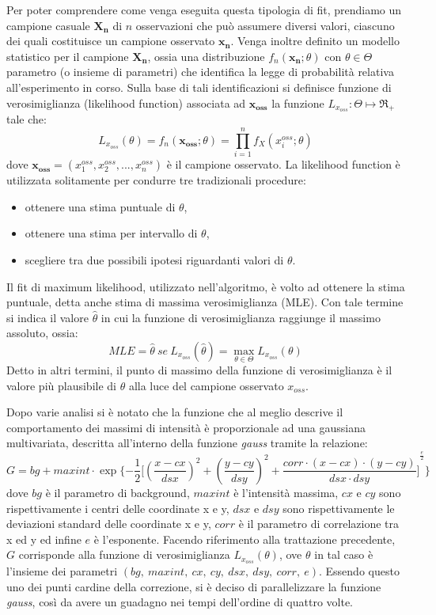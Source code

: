 Per poter comprendere come venga eseguita questa tipologia di fit, prendiamo un campione casuale $\mathbf{X_n}$ di $n$ osservazioni che può assumere diversi valori, ciascuno dei quali costituisce un campione osservato $\mathbf{x_n}$.
Venga inoltre definito un modello statistico per il campione $\mathbf{X_n}$, ossia una distribuzione $f_n (\mathbf{x_n};\theta)$ con $\theta \in \Theta$ parametro (o insieme di parametri) che identifica la legge di probabilità relativa all'esperimento in corso.
Sulla base di tali identificazioni si definisce funzione di verosimiglianza (likelihood function)
associata ad $\mathbf{x_{oss}}$ la funzione $L_{x_{oss}}: \Theta\longmapsto \Re_+$ tale che:
$$L_{x_{oss}}(\theta)=f_n (\mathbf{x_{oss}};\theta)=\prod_{i=1}^n f_X (x^{oss}_i;\theta) $$
dove $\mathbf{x_{oss}}=(x^{oss}_1, x^{oss}_2, ..., x^{oss}_n)$ è il campione osservato. 
La likelihood function è utilizzata solitamente per condurre tre tradizionali procedure:
\begin{itemize}
 \item ottenere una stima puntuale di $\theta$,
 \item ottenere una stima per intervallo di $\theta$,
 \item scegliere tra due possibili ipotesi riguardanti valori di $\theta$.
\end{itemize}
Il fit di maximum likelihood, utilizzato nell'algoritmo, è volto ad ottenere la stima puntuale, detta anche stima di massima verosimiglianza (MLE). 
Con tale termine si indica il valore $\hat{\theta}$ in cui la funzione di verosimiglianza raggiunge il massimo assoluto, ossia:
$$MLE = \hat{\theta}\ se\ L_{x_{oss}}(\hat{\theta})=\max_{\theta \in \Theta} L_{x_{oss}}(\theta)$$
Detto in altri termini, il punto di massimo della funzione di verosimiglianza è il valore più plausibile di $\theta$ alla luce del campione osservato $x_{oss}$.

Dopo varie analisi si è notato che la funzione che al meglio descrive il comportamento dei massimi di intensità è proporzionale ad una gaussiana multivariata, descritta all'interno della funzione \textit{gauss} tramite la relazione:
$$ G = bg + maxint \cdot \exp \{ {-\frac{1}{2} [{     (\frac{x-cx}{dsx})^2   +  (\frac{y-cy}{dsy})^2  +  \frac{corr \cdot (x-cx) \cdot (y-cy)}{dsx \cdot dsy} ]}^{\frac{e}{2}}}\} $$
dove $bg$ è il parametro di background, $maxint$ è l'intensità massima, $cx$ e $cy$ sono rispettivamente i centri delle coordinate x e y, $dsx$ e $dsy$ sono rispettivamente le deviazioni standard delle coordinate x e y, $corr$ è il parametro di correlazione tra x ed y ed infine $e$ è l'esponente.
Facendo riferimento alla trattazione precedente, $G$ corrisponde alla funzione di verosimiglianza $L_{x_{oss}}(\theta)$, ove $\theta$ in tal caso è l'insieme dei parametri $(bg,\ maxint,\ cx,\ cy,\ dsx,\ dsy,\ corr,\ e)$.
Essendo questo uno dei punti cardine della correzione, si è deciso di parallelizzare la funzione \textit{gauss}, così da avere un guadagno nei tempi dell'ordine di quattro volte.

